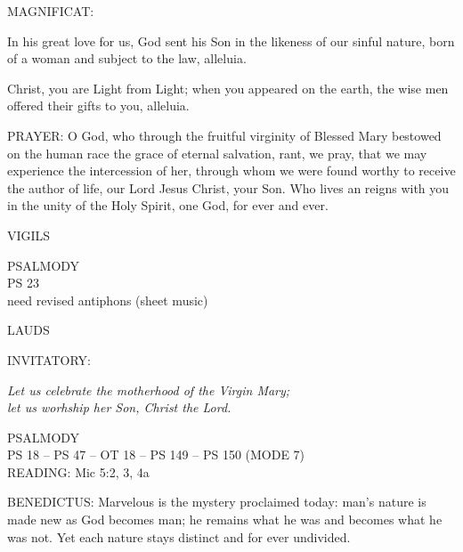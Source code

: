 \noindent\small{\uppercase{MAGNIFICAT:}}\begin{description}[labelindent=\parindent, leftmargin=*]
\item [(before the Epiphany)] In his great love for us, God sent his Son in the likeness of our sinful nature, born of a woman and subject to the law, alleluia.
\item [(Tuesday after the Epiphany)] Christ, you are Light from Light; when you appeared on the earth, the wise men offered their gifts to you, alleluia.
\end{description}

\noindent\small{\uppercase{PRAYER:}}	O God, who through the fruitful virginity of Blessed Mary bestowed on the human race the grace of eternal salvation, rant, we pray, that we may experience the intercession of her, through whom we were found worthy to receive the author of life, our Lord Jesus Christ, your Son. Who lives an reigns with you in the unity of the Holy Spirit, one God, for ever and ever.

\begin{flushleft}\normalsize{\uppercase{VIGILS\\}}\end{flushleft}
\noindent\small{\uppercase{PSALMODY}\\}
\uppercase{Ps 23}\vspace{0.5em}\\

need revised antiphons (sheet music)

\begin{flushleft}\normalsize{\uppercase{LAUDS\\}}\end{flushleft}
\small{\uppercase{INVITATORY:}}\normalsize
\begin{center}
\textit{Let us celebrate the motherhood of the Virgin Mary;\\}
\textit{let us worhship her Son, Christ the Lord.\\}
\end{center}
\noindent\small{\uppercase{PSALMODY}\\}
\uppercase{Ps 18 -- Ps 47 -- OT 18 -- Ps 149 -- Ps 150 (mode 7)}\vspace{0.5em}\\

\noindent \small READING:    Mic 5:2, 3, 4a    

\noindent\small{\uppercase{BENEDICTUS:}}	Marvelous is the mystery proclaimed today: man's nature is made new as God becomes man; he remains what he was and becomes what he was not. Yet each nature stays distinct and for ever undivided.\\

